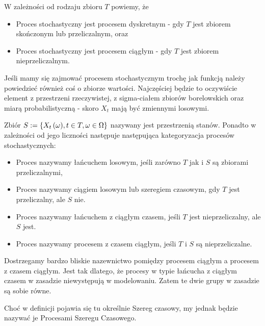 \documentclass[10pt,a4paper]{book}
\begin{document}
\begin{definition}
W zależności od rodzaju zbioru $T$ powiemy, że
\begin{itemize}
\item Proces stochastyczny jest procesem dyskretnym - gdy $T$ jest zbiorem skończonym lub przeliczalnym, oraz
\item Proces stochastyczny jest procesem ciągłym - gdy $T$ jest zbiorem nieprzeliczalnym.
\end{itemize}
\end{definition}

Jeśli mamy się zajmować procesem stochastycznym trochę jak funkcją należy powiedzieć również coś o zbiorze wartości. Najczęściej będzie to oczywiście element z przestrzeni rzeczywistej, z sigma-ciałem zbiorów borelowskich oraz miarą probabilistyczną - skoro $X_t$ mają być zmiennymi losowymi.

\begin{definition}
Zbiór $S := \left\lbrace { {{X_t}\left( {\omega} \right)}, t \in T, \omega \in \Omega } \right\rbrace$ nazywany jest przestrzenią stanów. Ponadto w zależności od jego liczności następuje następująca kategoryzacja procesów stochastycznych:
\begin{itemize}
\item Proces nazywamy łańcuchem losowym, jeśli zarówno $T$ jak i $S$ są zbiorami przeliczalnymi,
\item Proces nazywamy ciągiem losowym lub szeregiem czasowym, gdy $T$ jest przeliczalny, ale $S$ nie.
\item Proces nazywamy łańcuchem z ciągłym czasem, jeśli $T$ jest nieprzeliczalny, ale $S$ jest.
\item Proces nazywamy procesem z czasem ciągłym, jeśli $T$ i $S$ są nieprzeliczalne.
\end{itemize}

\end{definition}

\begin{remark*}
Dostrzegamy bardzo bliskie nazewnictwo pomiędzy procesem ciągłym a procesem z czasem ciągłym. Jest tak dlatego, że procesy w typie łańcucha z ciągłym czasem w zasadzie niewystępują w modelowaniu. Zatem te dwie grupy w zasadzie są sobie równe.
\end{remark*}

\begin{remark*}
Choć w definicji pojawia się tu określnie Szereg czasowy, my jednak będzie nazywać je Procesami Szeregu Czasowego.
\end{remark*}
\end{document}
